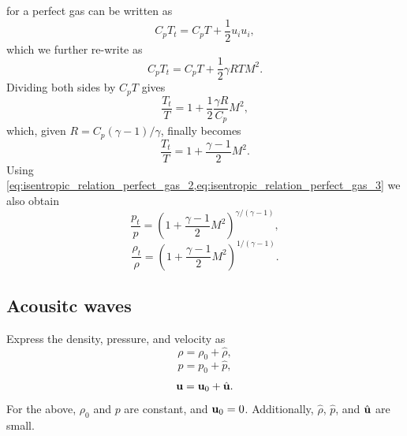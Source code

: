 \documentclass[oneside,a4paper,11pt]{report}
\begin{document}
 for a perfect gas can be written as
\begin{equation}
    C_p T_t = C_p T + \frac{1}{2} u_i u_i,
\end{equation}
which we further re-write as
\begin{equation}
    C_p T_t = C_p T + \frac{1}{2} \gamma R T M^2.
\end{equation}
Dividing both sides by $C_pT$ gives
\begin{equation}
    \frac{T_t}{T} = 1 + \frac{1}{2} \frac{\gamma R}{C_p} M^2,
\end{equation}
which, given $R = C_p (\gamma -1)/\gamma$, finally becomes
\begin{equation}
\label{eq:stagnation_temperature}
    \frac{T_t}{T} = 1 + \frac{\gamma - 1}{2} M^2.
\end{equation}
Using \cref{eq:isentropic_relation_perfect_gas_2,eq:isentropic_relation_perfect_gas_3} we also obtain
\begin{equation}
\label{eq:stagnation_pressure}
    \frac{p_t}{p} = \left ( 1 + \frac{\gamma -1}{2} M^2 \right)^{\gamma / (\gamma - 1)},
\end{equation}
\begin{equation}
\label{eq:stagnation_density}
    \frac{\rho_t}{\rho} = \left ( 1 + \frac{\gamma -1}{2} M^2 \right)^{1 / (\gamma - 1)}.
\end{equation}

\subsection{Acousitc waves}

Express the density, pressure, and velocity as 
\begin{equation}
    \rho = \rho_0 + \hat{\rho},
\end{equation}
\begin{equation}
    p = p_0 + \hat{p},
\end{equation}
\begin{equation}
    \mathbf{u} = \mathbf{u}_0 + \hat{\mathbf{u}}.
\end{equation}
For the above, $\rho_0$ and $p$ are constant, and $\mathbf{u}_0 = 0$. Additionally, $\hat{\rho}$, $\hat{p}$, and $\hat{\mathbf{u}}$ are small.
\end{document}
